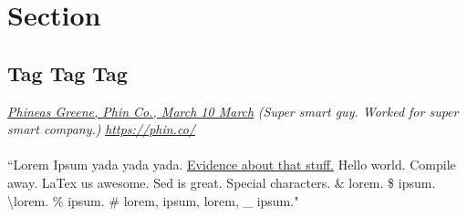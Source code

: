 \documentclass{article}
\author{Typesetting By Phineas Greene}
\begin{document}
\maketitle
\tableofcontents
\newpage
{}
\section{Section}
\subsection{Tag Tag Tag}
\textit{\ul{Phineas Greene, Phin Co., March 10 March}}
\textit{(Super smart guy. Worked for super smart company.)}
\textit{\url{https://phin.co/}}
\paragraph{}``Lorem Ipsum yada yada yada. \ul{Evidence about that stuff.} Hello world. Compile away. LaTex us awesome. Sed is great. Special characters. \& lorem. \$ ipsum. \textbackslash  lorem. \% ipsum. \# lorem, { ipsum, } lorem, \_ ipsum."
\end{document}

